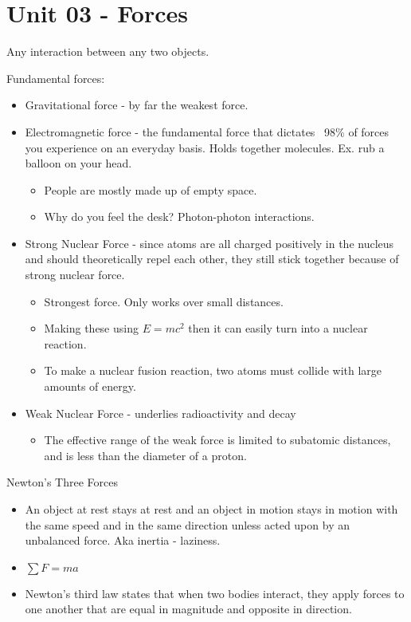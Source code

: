 \documentclass{scrreprt} %
\begin{document}
\section{Unit 03 - Forces}

\begin{definition}[Force]
	Any interaction between any two objects.
\end{definition}

\begin{definition}
	Fundamental forces:

	\begin{itemize}
		\item Gravitational force - by far the weakest force.
		\item Electromagnetic force - the fundamental force that dictates ~98\%
		of forces you experience on an everyday basis. Holds together molecules.
		Ex. rub a balloon on your head.
		\begin{itemize}
			\item People are mostly made up of empty space.
			\item Why do you feel the desk? Photon-photon interactions.
		\end{itemize}
		\item Strong Nuclear Force - since atoms are all charged positively
		in the nucleus and should theoretically repel each other, they still stick
		together because of strong nuclear force.
		\begin{itemize}
			\item Strongest force. Only works over small distances.
			\item Making these using $E=mc^2$ then it can
			easily turn into a nuclear reaction.
			\item To make a nuclear fusion reaction, two atoms must collide with large amounts
			of energy. 
		\end{itemize}
		\item Weak Nuclear Force - underlies radioactivity and decay
		\begin{itemize}
			\item The effective range of the weak force is limited to subatomic
			distances, and is less than the diameter of a proton.
		\end{itemize}
	\end{itemize}
\end{definition}

Newton's Three Forces

\begin{itemize}
	\item An object at rest stays at rest and an object in motion stays in
	motion with the same speed and in the same direction unless acted upon by an
	unbalanced force. Aka inertia - laziness.
	\item $\sum F = ma$
	\item Newton’s third law states that when two bodies interact, they apply
	forces to one another that are equal in magnitude and opposite in direction.
\end{itemize}
\end{document}
